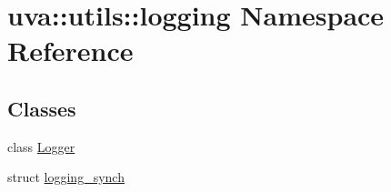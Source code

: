 \hypertarget{namespaceuva_1_1utils_1_1logging}{}\section{uva\+:\+:utils\+:\+:logging Namespace Reference}
\label{namespaceuva_1_1utils_1_1logging}
\subsection*{Classes}
\begin{DoxyCompactItemize}
\item 
class \hyperlink{classuva_1_1utils_1_1logging_1_1_logger}{Logger}
\item 
struct \hyperlink{structuva_1_1utils_1_1logging_1_1logging__synch}{logging\+\_\+synch}
\end{DoxyCompactItemize}
